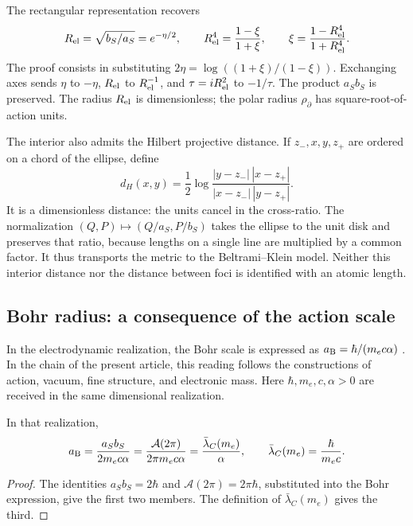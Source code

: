 The rectangular representation recovers
\begin{equation}
 R_{\rm el}=\sqrt{b_S/a_S}=e^{-\eta/2},\qquad
 R_{\rm el}^4=\frac{1-\xi}{1+\xi},\qquad
 \xi=\frac{1-R_{\rm el}^4}{1+R_{\rm el}^4}.
 \label{eq:ii-elipse-reciproca}
\end{equation}
The proof consists in substituting
\(2\eta=\log((1+\xi)/(1-\xi))\). Exchanging axes
sends \(\eta\) to \(-\eta\), \(R_{\rm el}\) to
\(R_{\rm el}^{-1}\), and \(\tau=iR_{\rm el}^2\) to \(-1/\tau\).
The product \(a_Sb_S\) is preserved. The radius \(R_{\rm el}\) is dimensionless;
the polar radius \(\rho_{\partial}\) has square-root-of-action units.

The interior also admits the Hilbert projective distance. If
\(z_-,x,y,z_+\) are ordered on a chord of the ellipse, define
\[
 d_H(x,y)=\frac12\log
 \frac{|y-z_-|\,|x-z_+|}{|x-z_-|\,|y-z_+|}.
\]
It is a dimensionless distance: the units cancel in the cross-ratio.
The normalization \((Q,P)\mapsto(Q/a_S,P/b_S)\) takes the ellipse
to the unit disk and preserves that ratio, because lengths on a
single line are multiplied by a common factor. It thus transports the metric
to the Beltrami--Klein model. Neither this interior distance nor the distance
between foci is identified with an atomic length.

\subsection{Bohr radius: a consequence of the action scale}
\label{sec:ii-elipse-bohr}

In the electrodynamic realization, the Bohr scale is expressed as
\(a_{\rm B}=\hbar/(m_ec\alpha)\) \cite{codata2022}. In the chain
of the present article, this reading follows the constructions of
action, vacuum, fine structure, and electronic mass. Here
\(\hbar,m_e,c,\alpha>0\) are received in the same dimensional realization.
\begin{proposition}
\label{prop:ii-elipse-bohr}
In that realization,
\begin{equation}
 a_{\rm B}=\frac{a_Sb_S}{2m_ec\alpha}
 =\frac{\mathcal A(2\pi)}{2\pi m_ec\alpha}
 =\frac{\bar\lambda_C(m_e)}{\alpha},\qquad
 \bar\lambda_C(m_e)=\frac{\hbar}{m_ec}.
 \label{eq:ii-elipse-bohr}
\end{equation}
\end{proposition}
\begin{proof}
The identities \(a_Sb_S=2\hbar\) and
\(\mathcal A(2\pi)=2\pi\hbar\), substituted into the Bohr
expression, give the first two members. The definition of
\(\bar\lambda_C(m_e)\) gives the third.
\end{proof}

